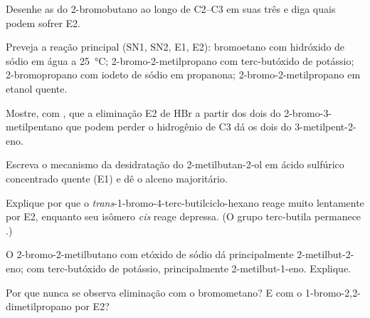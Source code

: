 \begin{exercise}[$\star$]\label{exo:b1:elimination:3}
Desenhe as  do 2-bromobutano ao longo de C2--C3 em
suas três  e diga quais podem sofrer E2.
\end{exercise}

\begin{exercise}[$\star$]\label{exo:b1:elimination:4}
Preveja a reação principal (SN1, SN2, E1, E2): bromoetano com hidróxido
de sódio em água a \qty{25}{\celsius}; 2-bromo-2-metilpropano com
terc-butóxido de potássio; 2-bromopropano com iodeto de sódio em
propanona; 2-bromo-2-metilpropano em etanol quente.
\end{exercise}

\begin{exercise}[$\star\star$]\label{exo:b1:elimination:5}
Mostre, com , que a eliminação E2 de HBr a partir dos
dois  do 2-bromo-3-metilpentano que podem perder o
hidrogênio de C3 dá os dois  do 3-metilpent-2-eno.
\end{exercise}

\begin{exercise}[$\star\star$]\label{exo:b1:elimination:6}
Escreva o mecanismo da desidratação do 2-metilbutan-2-ol em ácido
sulfúrico concentrado quente (E1) e dê o alceno majoritário.
\end{exercise}

\begin{exercise}[$\star\star$]\label{exo:b1:elimination:7}
Explique por que o \textit{trans}-1-bromo-4-terc-butilciclo-hexano reage
muito lentamente por E2, enquanto seu isômero \textit{cis} reage depressa.
(O grupo terc-butila permanece .)
\end{exercise}

\begin{exercise}[$\star\star$]\label{exo:b1:elimination:8}
O 2-bromo-2-metilbutano com etóxido de sódio dá principalmente
2-metilbut-2-eno; com terc-butóxido de potássio, principalmente
2-metilbut-1-eno. Explique.
\end{exercise}

\begin{exercise}[$\star\star$]\label{exo:b1:elimination:9}
Por que nunca se observa eliminação com o bromometano? E com o
1-bromo-2,2-dimetilpropano por E2?
\end{exercise}

